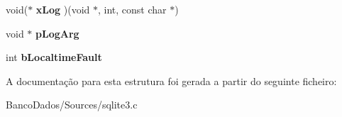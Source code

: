 \begin{DoxyCompactItemize}
\item 
\hypertarget{struct_sqlite3_config_a59bd59da6676dc62f9acdd6ff6d27d82}{void($\ast$ {\bfseries x\-Log} )(void $\ast$, int, const char $\ast$)}\label{struct_sqlite3_config_a59bd59da6676dc62f9acdd6ff6d27d82}

\item 
\hypertarget{struct_sqlite3_config_a501ab4552bc7c54bb413aced5889dcdc}{void $\ast$ {\bfseries p\-Log\-Arg}}\label{struct_sqlite3_config_a501ab4552bc7c54bb413aced5889dcdc}

\item 
\hypertarget{struct_sqlite3_config_a7bdc3109ecd839317f722b5da5339fab}{int {\bfseries b\-Localtime\-Fault}}\label{struct_sqlite3_config_a7bdc3109ecd839317f722b5da5339fab}

\end{DoxyCompactItemize}


A documentação para esta estrutura foi gerada a partir do seguinte ficheiro\-:\begin{DoxyCompactItemize}
\item 
Banco\-Dados/\-Sources/sqlite3.\-c\end{DoxyCompactItemize}
